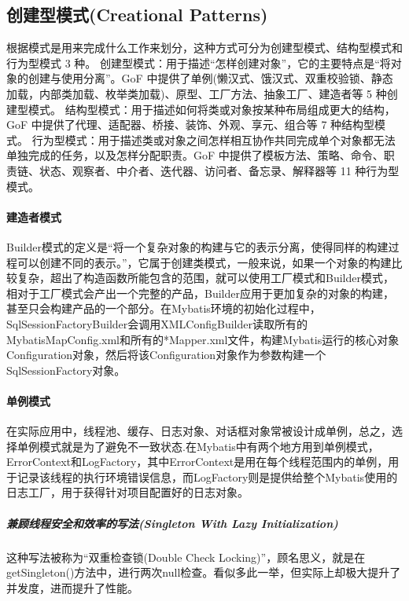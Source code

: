 \documentclass[../../../interview-questions.tex]{subfiles}
\begin{document}
\subsection{创建型模式(Creational Patterns)}

根据模式是用来完成什么工作来划分，这种方式可分为创建型模式、结构型模式和行为型模式 3 种。
创建型模式：用于描述“怎样创建对象”，它的主要特点是“将对象的创建与使用分离”。GoF 中提供了单例(懒汉式、饿汉式、双重校验锁、静态加载，内部类加载、枚举类加载)、原型、工厂方法、抽象工厂、建造者等 5 种创建型模式。
结构型模式：用于描述如何将类或对象按某种布局组成更大的结构，GoF 中提供了代理、适配器、桥接、装饰、外观、享元、组合等 7 种结构型模式。
行为型模式：用于描述类或对象之间怎样相互协作共同完成单个对象都无法单独完成的任务，以及怎样分配职责。GoF 中提供了模板方法、策略、命令、职责链、状态、观察者、中介者、迭代器、访问者、备忘录、解释器等 11 种行为型模式。


\paragraph{建造者模式}

Builder模式的定义是“将一个复杂对象的构建与它的表示分离，使得同样的构建过程可以创建不同的表示。”，它属于创建类模式，一般来说，如果一个对象的构建比较复杂，超出了构造函数所能包含的范围，就可以使用工厂模式和Builder模式，相对于工厂模式会产出一个完整的产品，Builder应用于更加复杂的对象的构建，甚至只会构建产品的一个部分。在Mybatis环境的初始化过程中，SqlSessionFactoryBuilder会调用XMLConfigBuilder读取所有的MybatisMapConfig.xml和所有的*Mapper.xml文件，构建Mybatis运行的核心对象Configuration对象，然后将该Configuration对象作为参数构建一个SqlSessionFactory对象。

\paragraph{单例模式}

在实际应用中，线程池、缓存、日志对象、对话框对象常被设计成单例，总之，选择单例模式就是为了避免不一致状态.在Mybatis中有两个地方用到单例模式，ErrorContext和LogFactory，其中ErrorContext是用在每个线程范围内的单例，用于记录该线程的执行环境错误信息，而LogFactory则是提供给整个Mybatis使用的日志工厂，用于获得针对项目配置好的日志对象。

\subparagraph{兼顾线程安全和效率的写法(Singleton With Lazy Initialization)}

这种写法被称为“双重检查锁(Double Check Locking)”，顾名思义，就是在getSingleton()方法中，进行两次null检查。看似多此一举，但实际上却极大提升了并发度，进而提升了性能。
\end{document}
